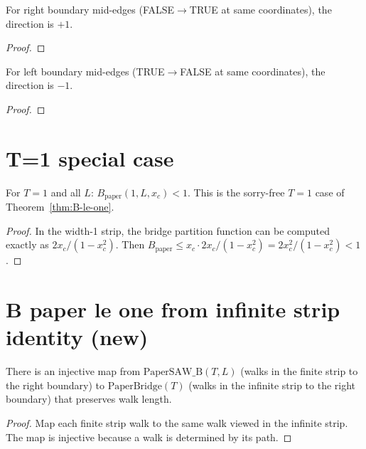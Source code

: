 \begin{lemma}
\begin{enumerate}
\begin{lemma}\label{lem:right-dir}
\leanok
  For right boundary mid-edges (FALSE$\to$TRUE at same coordinates),
  the direction is $+1$.
\end{lemma}
\begin{proof}
\leanok
\end{proof}

\begin{lemma}\label{lem:left-dir}
\leanok
  For left boundary mid-edges (TRUE$\to$FALSE at same coordinates),
  the direction is $-1$.
\end{lemma}
\begin{proof}
\leanok
\end{proof}

\section{T=1 special case}

\begin{theorem}\label{thm:B-1-lt-1}
\leanok
  For $T = 1$ and all $L$: $B_{\text{paper}}(1,L,x_c) < 1$.
  This is the sorry-free $T{=}1$ case of Theorem~\ref{thm:B-le-one}.
\end{theorem}
\begin{proof}
\leanok
{}
  In the width-1 strip, the bridge partition function can be computed
  exactly as $2x_c/(1-x_c^2)$. Then $B_{\text{paper}} \leq x_c \cdot
  2x_c/(1-x_c^2) = 2x_c^2/(1-x_c^2) < 1$.
\end{proof}

\section{B paper le one from infinite strip identity (new)}

\begin{lemma}
\label{lem:finite-to-infinite-injection}
\leanok
  There is an injective map from $\text{PaperSAW\_B}(T,L)$ (walks in the
  finite strip to the right boundary) to $\text{PaperBridge}(T)$ (walks
  in the infinite strip to the right boundary) that preserves walk length.
\end{lemma}
\begin{proof}
\leanok
  Map each finite strip walk to the same walk viewed in the infinite strip.
  The map is injective because a walk is determined by its path.
\end{proof}


\end{enumerate}
\end{lemma}
